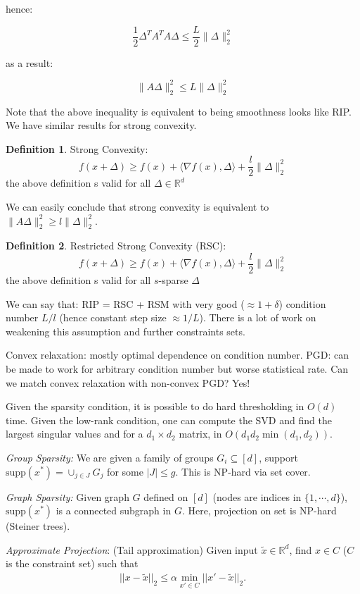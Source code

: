 \documentclass{article}
\theoremstyle{definition}
\newtheorem{definition}{Definition}
\begin{document}
hence:

$$\frac{1}{2}\Delta^TA^TA\Delta \leq \frac{L}{2}\|\Delta\|_2^2$$

as a result:

$$\|A\Delta \|_2^2 \leq L\|\Delta\|_2^2$$

Note that the above inequality is equivalent to being smoothness looks like RIP.
We have similar results for strong convexity.
\begin{definition}
Strong Convexity:
$$f(x+\Delta) \geq f(x) + \langle \nabla f(x), \Delta \rangle + \frac{l}{2} \| \Delta\|_2^2 $$
the above definition s valid for all $\Delta \in \mathbb{R}^d$  
\end{definition}
We can easily conclude that strong convexity is equivalent to $\|A\Delta \|_2^2 \geq l\|\Delta\|_2^2$.

\begin{definition}
Restricted Strong Convexity (RSC):
$$f(x+\Delta) \geq f(x) + \langle \nabla f(x), \Delta \rangle + \frac{l}{2} \| \Delta\|_2^2 $$
the above definition s valid for all $s$-sparse $\Delta$  
\end{definition}
We can say that:
RIP = RSC + RSM with very good ($\approx 1 + \delta$) condition number $L/l$ (hence constant step size $\approx 1/L$).
There is a lot of work on weakening this assumption and further constraints sets.

Convex relaxation: mostly optimal dependence on condition number.
PGD: can be made to work for arbitrary condition number but worse statistical rate.
Can we match convex relaxation with non-convex PGD? Yes!

Given the sparsity condition, it is possible to do hard thresholding in $O(d)$ time. Given the low-rank condition, one can compute the SVD and find the largest singular values and for a $d_1 \times d_2$ matrix, in $O(d_1 d_2 \min( d_1, d_2)).$


\emph{Group Sparsity:}
We are given a family of groups $G_i \subseteq [d]$, support $\text{supp}(x^*) = \cup_{j \in J} G_j$ for some $|J| \leq g.$ This is NP-hard via set cover. 


\emph{Graph Sparsity:}
Given graph $G$ defined on $[d]$ (nodes are indices in $\{ 1, \cdots, d\}$), $\text{supp}(x^*)$ is a connected subgraph in $G$. Here, projection on set is NP-hard (Steiner trees). 


\emph{Approximate Projection}:
(Tail approximation) Given input $\tilde{x} \in \mathbb{R}^d$, find $x \in C$ ($C$ is the constraint set) such that 
\begin{align*}
||x - \tilde{x} ||_2 \leq \alpha \min_{x' \in C} || x'- \tilde{x}||_2. 
\end{align*}
\end{document}
